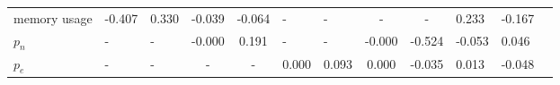 \begin{tabular}{lggccggccggg}
memory usage          &             -0.407  &           0.330  &             -0.039  &          -0.064  &                  -  &               -  &                  -  &             - &  0.233 &        -0.167 \\
$p_n$                 &                  -  &               -  &             -0.000  &           0.191  &                  -  &               -  &             -0.000  &        -0.524 & -0.053 &         0.046 \\
$p_e$                 &                  -  &               -  &                  -  &               -  &              0.000  &           0.093  &              0.000  &        -0.035 &  0.013 &        -0.048 \\
\bottomrule
\end{tabular}
